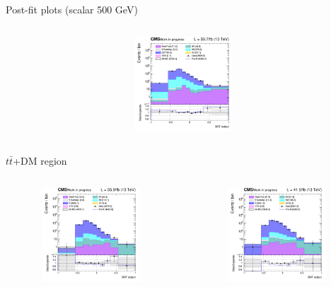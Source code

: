\documentclass[8pt]{beamer}
\begin{document}
\begin{frame}{Post-fit plots (scalar 500 GeV)}
\begin{columns}
\begin{column}{0.33\textwidth}
\begin{center}
     			\includegraphics[width=1.0\textwidth, height=100pt]{figs/postfits/2018/log_cratio_ST_topCR_ll_BDT_tDM500_TTbar_BDT_output_scalar500_customBinsAttempt7.png}
    		\end{center}		
		\end{column}
\end{columns}

\vspace{-8pt}
\begin{columns}
\begin{column}{1.09\textwidth}
\begin{block}{\centering $t \bar t$+DM region}\end{block} \vspace{10pt}
\end{column}
\end{columns} \vspace{-16pt}
\begin{columns}
		\begin{column}{0.33\textwidth}
			\begin{center}
     			\includegraphics[width=1.0\textwidth, height=100pt]{figs/postfits/2016/log_cratio_TTbar_topCR_ll_BDT_ttDM500_TTbar_BDT_output_scalar500_customBinsAttempt7.png}
    		\end{center}		
		\end{column}
		\begin{column}{0.33\textwidth}
			\begin{center}
     			\includegraphics[width=1.0\textwidth, height=100pt]{figs/postfits/2017/log_cratio_TTbar_topCR_ll_BDT_ttDM500_TTbar_BDT_output_scalar500_customBinsAttempt7.png}

\end{center}
\end{column}
\end{columns}
\end{frame}
\end{document}
